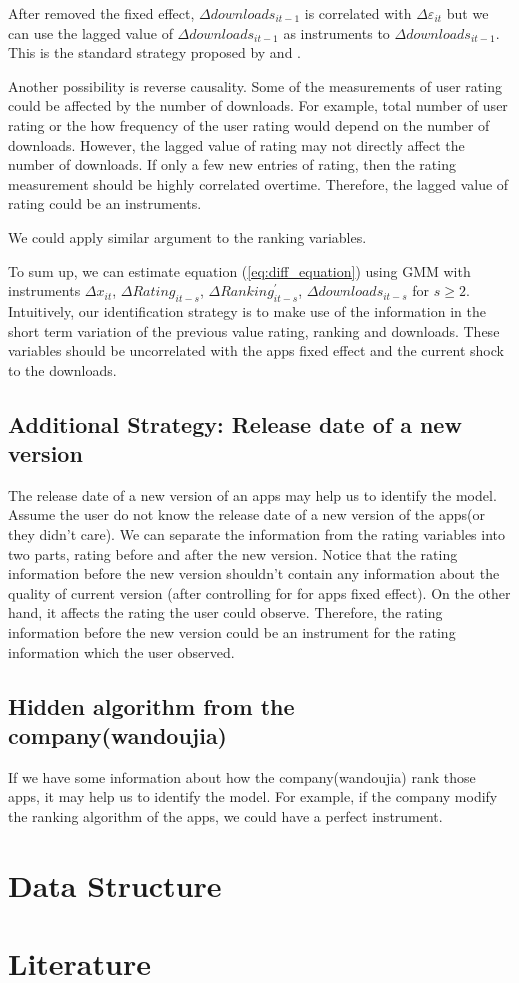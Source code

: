 \documentclass[11pt,twoside]{article}
\begin{document}
	After removed the fixed effect, $\Delta downloads_{it-1}$ is correlated with $\Delta \varepsilon_{it}$ but we can use the lagged value of  $\Delta downloads_{it-1}$ as instruments to $\Delta downloads_{it-1}$. This is the standard strategy proposed by \cite{ArellanoBond1991} and \cite{Holtz-EakinNeweyRosen1988}. 
	
	
	Another possibility is reverse causality. Some of the measurements of user rating could be affected by the number of downloads. For example, total number of user rating or the how frequency of the user rating would depend on the number of downloads. However, the lagged value of rating may not directly affect the number of downloads. If only a few new entries of rating, then the rating measurement should be highly correlated overtime. Therefore, the lagged value of rating could be an instruments. 
	
	We could apply similar argument to the ranking variables. 
	
	To sum up, we can estimate equation (\ref{eq:diff_equation}) using GMM with instruments $\Delta x_{it}$, $\Delta Rating_{it-s} $, $\Delta Ranking_{it-s}^{'} $, $ \Delta downloads_{it-s}$ for $s\geq 2$.
	Intuitively, our identification strategy is to make use of the information in the short term variation of the previous value rating, ranking and downloads. These variables should be uncorrelated with the apps fixed effect and the current shock to the downloads.
	
\subsection{Additional Strategy: Release date of a new version}
The release date of a new version of an apps may help us to identify the model. Assume the user do not know the release date of a new version of the apps(or they didn't care). We can separate the information from the rating variables into two parts, rating before and after the new version. Notice that the rating information before the new version shouldn't contain any information about the quality of current version (after controlling for for apps fixed effect). On the other hand, it affects the rating the user could observe. Therefore, the rating information before the new version could be an instrument for the rating information which the user observed. 

\subsection{Hidden algorithm from the company(wandoujia)}
If we have some information about how the company(wandoujia) rank those apps, it may help us to identify the model. For example, if the company modify the ranking algorithm of the apps, we could have a perfect instrument. 

\section{Data Structure}

\section{Literature}
\newpage




\newpage

\appendix
\renewcommand{\thesection}{Appendix \Roman{section}}
\renewcommand{\thesubsection}{Appendix \Roman{section}(\roman{subsection})}
\end{document}
